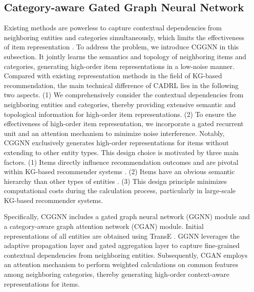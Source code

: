 \documentclass[conference]{IEEEtran}
\begin{document}
\subsection{Category-aware Gated Graph Neural Network}
Existing methods  \cite{PGPR} \cite{ADAC} \cite{UCPR}  \cite{INFER} \cite{SAPL} \cite{ReMR} \cite{CogER} are powerless to capture contextual dependencies from neighboring entities and categories simultaneously, which limits the effectiveness of item representation \cite{DREAM} \cite{TNNLS}. To address the problem, we introduce CGGNN in this subsection. It jointly learns the semantics and topology of neighboring items and categories, generating high-order item representations in a low-noise manner. Compared with existing representation methods in the field of KG-based recommendation, the main technical difference of CADRL lies in the following two aspects. (1) We comprehensively consider the contextual dependencies from neighboring entities and categories, thereby providing extensive semantic and topological information for high-order item representations. (2) To ensure the effectiveness of high-order item representation, we incorporate a gated recurrent unit and an attention mechanism to minimize noise interference. Notably, CGGNN exclusively generates high-order  representations for items without extending to other entity types. This design choice is motivated by three main factors. (1) Items directly influence recommendation outcomes
and are pivotal within KG-based recommender systems \cite{ITEM}.  (2) Items have an obvious semantic hierarchy than other types of entities \cite{survey2}. (3) This design principle minimizes  computational costs during the calculation process, particularly in large-scale KG-based recommender systems.

Specifically, CGGNN includes a gated graph neural network (GGNN) module and a category-aware graph attention network (CGAN) module. Initial representations of all entities are obtained using TransE \cite{TransE}.  GGNN leverages the adaptive propagation layer and gated aggregation layer to capture fine-grained contextual dependencies from neighboring entities. Subsequently, CGAN employs an attention mechanism to perform weighted calculations on common features among neighboring categories, thereby generating high-order context-aware representations for items.
\end{document}
